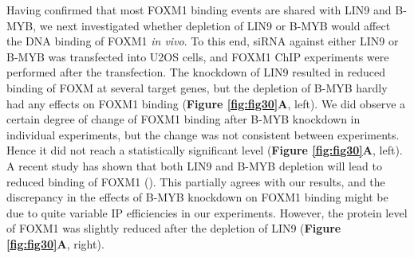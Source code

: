 Having confirmed that most FOXM1 binding events are shared with LIN9 and B-MYB, we next investigated whether depletion of LIN9 or B-MYB would affect the DNA binding of FOXM1 \textit{in vivo}. To this end, siRNA against either LIN9 or B-MYB was transfected into U2OS cells, and FOXM1 ChIP experiments were performed after the transfection. The knockdown of LIN9 resulted in reduced binding of FOXM at several target genes, but the depletion of B-MYB hardly had any effects on FOXM1 binding (\textbf{Figure \ref{fig:fig30}A}, left). We did observe a certain degree of change of FOXM1 binding after B-MYB knockdown in individual experiments, but the change was not consistent between experiments. Hence it did not reach a statistically significant level (\textbf{Figure \ref{fig:fig30}A}, left). A recent study has shown that both LIN9 and B-MYB depletion will lead to reduced binding of FOXM1 (\cite{sadasivam2012the}). This partially agrees with our results, and the discrepancy in the effects of B-MYB knockdown on FOXM1 binding might be due to quite variable IP efficiencies in our experiments. However, the protein level of FOXM1 was slightly reduced after the depletion of LIN9 (\textbf{Figure \ref{fig:fig30}A}, right).

